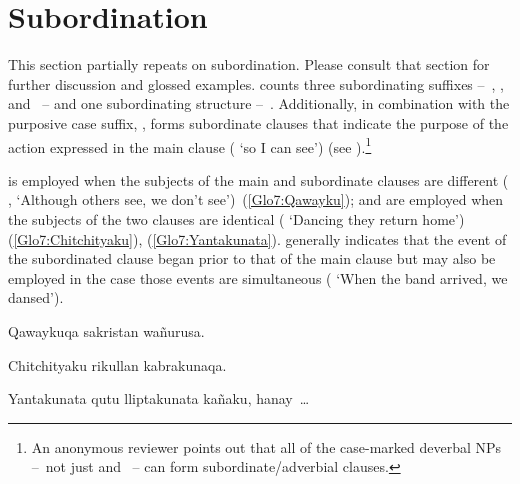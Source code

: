 \section{Subordination}
This section partially repeats  on subordination. Please consult that section for further discussion and glossed examples. \SYQ{} counts three subordinating suffixes --~, , and ~-- and one subordinating structure --~. Additionally, in combination with the purposive case suffix, ,  forms subordinate clauses that indicate the purpose of the action expressed in the main clause ( ‘so I can see’) (see ).\footnote{An anonymous reviewer points out that all of the case-marked deverbal NPs --~not just  and ~-- can form subordinate/adverbial clauses.}

 is employed when the subjects of the main and subordinate clauses are different ( ,   ‘Although others see, we don’t see’)~(\ref{Glo7:Qawayku});  and  are employed when the subjects of the two clauses are identical (   ‘Dancing they return home’) (\ref{Glo7:Chitchityaku}), (\ref{Glo7:Yantakunata}).  generally indicates that the event of the subordinated clause began prior to that of the main clause but may also be employed in the case those events are simultaneous (   ‘When the band arrived, we dansed’).

%
{Qawaykuqa sakristan wañurusa.}%
{}%
{}{}%

%
{Chitchityaku rikullan kabrakunaqa.}%
{}%
{}{}%

%
{Yantakunata qutu lliptakunata kañaku, hanay~\dots}%
{}%
{}{}%

